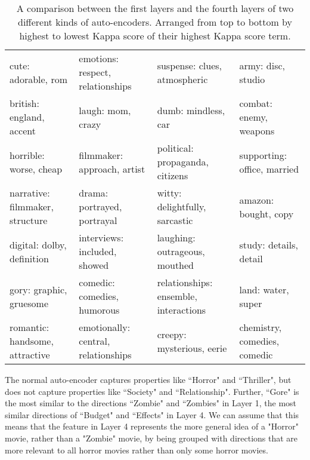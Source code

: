 \begin{sidewaystable}
\begin{tabular}{llll}
		cute: adorable, rom & emotions: respect, relationships & suspense: clues, atmospheric & army: disc, studio\\
		british: england, accent & laugh: mom, crazy & dumb: mindless, car & combat: enemy, weapons  \\
		horrible: worse, cheap & filmmaker: approach, artist & political: propaganda, citizens & supporting: office, married \\
		narrative: filmmaker, structure & drama: portrayed, portrayal & witty: delightfully, sarcastic & amazon: bought, copy \\
		digital: dolby, definition & interviews: included, showed & laughing: outrageous, mouthed & study: details, detail \\
		gory: graphic, gruesome & comedic: comedies, humorous & relationships: ensemble, interactions & land: water, super \\
		romantic: handsome, attractive & emotionally: central, relationships & creepy: mysterious, eerie & chemistry, comedies, comedic \\
		
	\end{tabular}
	\caption{A comparison between the first layers and the fourth layers of two different kinds of auto-encoders. Arranged from top to bottom by highest to lowest Kappa score of their highest Kappa score term. }
	\label{ch5:labelcomparison}
	
\end{sidewaystable}

The normal auto-encoder captures properties like ``Horror" and ``Thriller", but does not capture properties like ``Society" and ``Relationship". Further, ``Gore"  is the  most similar to the directions ``Zombie" and ``Zombies" in Layer 1, the most similar directions of ``Budget" and ``Effects" in Layer 4. We can assume that this means that the feature in Layer 4 represents the more general idea of a "Horror" movie, rather than a "Zombie" movie, by being grouped with directions that are more relevant to all horror movies rather than only some horror movies. 


